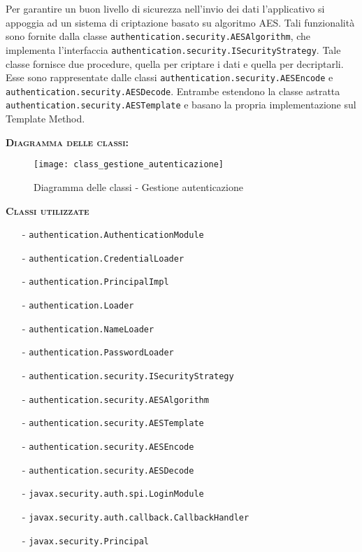 \begin{description}
Per garantire un buon livello di sicurezza nell'invio dei dati l'applicativo si appoggia ad un sistema di criptazione basato su algoritmo AES. Tali funzionalità sono fornite dalla classe \texttt{authentication.security.AESAlgorithm}, che implementa l'interfaccia \texttt{authentication.security.ISecurityStrategy}. Tale classe fornisce due procedure, quella per criptare i dati e quella per decriptarli. Esse sono rappresentate dalle classi \texttt{authentication.security.AESEncode} e \texttt{authentication.security.AESDecode}. Entrambe estendono la classe astratta \texttt{authentication.security.AESTemplate} e basano la propria implementazione sul  Template Method.
  
  \item{\scshape\bfseries Diagramma delle classi:}
\begin{figure}[H]
  \centering
 \texttt{[image: class\_gestione\_autenticazione]}
  \caption{Diagramma delle classi - Gestione autenticazione}\label{fig:gestioneautenticazione}
\end{figure}	
  
  \item{\scshape\bfseries Classi utilizzate}
  \begin{itemize}
    \item[-] \texttt{authentication.AuthenticationModule}
	\item[-] \texttt{authentication.CredentialLoader}
	\item[-] \texttt{authentication.PrincipalImpl}
	\item[-] \texttt{authentication.Loader}
	\item[-] \texttt{authentication.NameLoader}
	\item[-] \texttt{authentication.PasswordLoader}
	\item[-] \texttt{authentication.security.ISecurityStrategy}
 	\item[-] \texttt{authentication.security.AESAlgorithm}
 	\item[-] \texttt{authentication.security.AESTemplate}
 	\item[-] \texttt{authentication.security.AESEncode}
 	\item[-] \texttt{authentication.security.AESDecode}	
 	\item[-] \texttt{javax.security.auth.spi.LoginModule}
 	\item[-] \texttt{javax.security.auth.callback.CallbackHandler}
 	\item[-] \texttt{javax.security.Principal}
  \end{itemize}

\end{description}

